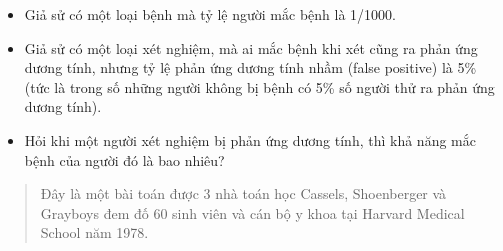 \begin{frame}

  \begin{xrcs}
    \begin{itemize}
    \item Giả sử có một loại bệnh mà tỷ lệ người mắc bệnh là
      1/1000.
    \item Giả sử có một loại xét nghiệm, mà ai mắc bệnh khi xét
      cũng ra phản ứng dương tính, nhưng tỷ lệ phản ứng dương tính
      nhầm (false positive) là 5\% (tức là trong số những người không
      bị bệnh có 5\% số người thử ra phản ứng dương tính).
    \item Hỏi khi một
      người xét nghiệm bị phản ứng dương tính, thì khả năng mắc bệnh
      của người đó là bao nhiêu?
    \end{itemize}
  \end{xrcs}
  
  \begin{quote}\color{blue!60}
  Đây là một bài toán được 3 nhà toán học Cassels, Shoenberger và Grayboys đem đố 60 sinh viên và cán bộ y khoa tại Harvard
Medical School năm 1978.     
  \end{quote}

\end{frame}






